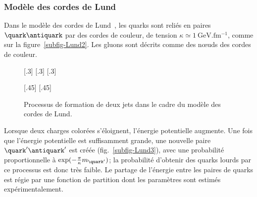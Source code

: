 \subsubsection{Modèle des cordes de Lund}\label{chapter-JERC-section-jets-subsec-hadronisation-subsubsec-Lund}
Dans le modèle des cordes de Lund~\cite{Andersson_parton_fragmentation}, les quarks sont reliés en paires $\quark\antiquark$ par des \og cordes \fg{} de couleur, de tension $\kappa \simeq \SI{1}{\GeV.\femto\meter^{-1}}$, comme sur la figure~\ref{subfig-Lund2}. Les gluons sont décrits comme des nœuds des cordes de couleur.
\begin{figure}[h]
\centering
{}[.3\textwidth]
{}
\hfill
{}[.3\textwidth]
{}
\hfill
{}[.3\textwidth]
{}

\vspace{\baselineskip}

[.45\textwidth]
{}
\hfill
{}[.45\textwidth]
{}

\caption[Formation de jets dans le cadre du modèle des cordes de Lund.]{Processus de formation de deux jets dans le cadre du modèle des cordes de Lund.}
\label{fig-Lund}
\end{figure}
\par Lorsque deux charges colorées s'éloignent, l'énergie potentielle augmente.
Une fois que l'énergie potentielle est suffisamment grande, une nouvelle paire $\quark'\antiquark'$ est créée (fig.~\ref{subfig-Lund3}), avec une probabilité proportionnelle à $\exp(-\frac{\pi}{\kappa} m_{\quark'})$; la probabilité d'obtenir des quarks lourds par ce processus est donc très faible.
Le partage de l'énergie entre les paires de quarks est régie par une fonction de partition dont les paramètres sont estimés expérimentalement.

